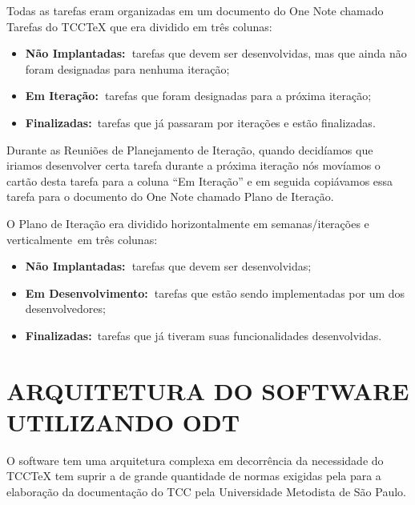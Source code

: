 \bigskip

Todas as tarefas eram organizadas em um documento do One Note chamado Tarefas do TCCTeX que era dividido em tr\^es
colunas:

\liststyleLFOii
\begin{itemize}
\item {
\textbf{N\~ao Implantadas:\ }tarefas que devem ser desenvolvidas, mas que ainda n\~ao foram designadas para nenhuma
itera\c{c}\~ao;}
\item {
\textbf{Em Itera\c{c}\~ao:\ }tarefas que foram designadas para a pr\'oxima itera\c{c}\~ao;}
\item {
\textbf{Finalizadas:}\ tarefas que j\'a passaram por itera\c{c}\~oes e est\~ao finalizadas.}
\end{itemize}

\bigskip

Durante as Reuni\~oes de Planejamento de Itera\c{c}\~ao, quando decid\'iamos que iriamos desenvolver certa tarefa
durante a pr\'oxima itera\c{c}\~ao n\'os mov\'iamos o cart\~ao desta tarefa para a coluna ``Em Itera\c{c}\~ao'' e em
seguida copi\'avamos essa tarefa para o documento do One Note chamado Plano de Itera\c{c}\~ao.

O Plano de Itera\c{c}\~ao era dividido horizontalmente em semanas/itera\c{c}\~oes e verticalmente\ em tr\^es colunas:

\liststyleLFOii
\begin{itemize}
\item {
\textbf{N\~ao Implantadas:\ }tarefas que devem ser desenvolvidas;}
\item {
\textbf{Em Desenvolvimento:\ }tarefas que est\~ao sendo implementadas por um dos desenvolvedores;}
\item {
\textbf{Finalizadas:}\ tarefas que j\'a tiveram suas funcionalidades desenvolvidas.}
\end{itemize}

\bigskip

\section{ARQUITETURA DO SOFTWARE UTILIZANDO ODT}

\bigskip

O software tem uma arquitetura complexa em decorr\^encia da necessidade do TCCTeX tem suprir a de grande quantidade de
normas exigidas pela para a elabora\c{c}\~ao da documenta\c{c}\~ao do TCC pela Universidade Metodista de S\~ao Paulo.

